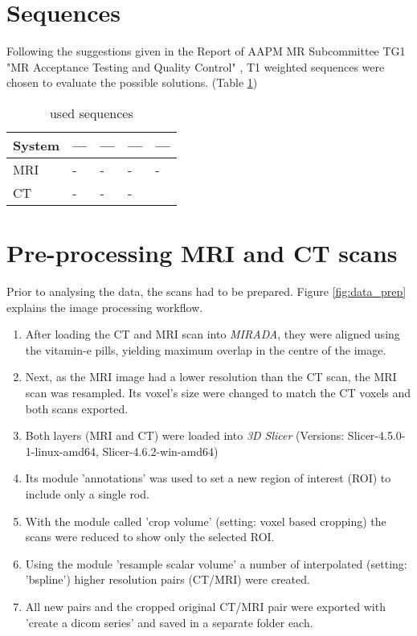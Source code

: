 \section{Sequences}

Following the suggestions given in the Report of AAPM MR Subcommittee TG1 "MR Acceptance Testing and
Quality Control" \cite{Jackson2009}, T1 weighted sequences were chosen to evaluate the possible solutions. (Table \ref{tab:settings})

\begin{table}[h]
\centering
\begin{tabular}{@{}lllll@{}}
System & ---  & --- &  --- & --- \\
\toprule
MRI    & -   & -   & -   & -    \\
CT     & -   & -   & -   &
\end{tabular}
\caption{used sequences}
\label{tab:settings}
\end{table}



\section{Pre-processing MRI and CT scans}
\label{sec:prep}

Prior to analysing the data, the scans had to be prepared.
Figure \ref{fig:data_prep} explains the image processing workflow.

\begin{enumerate}[label=\textbf{Step \arabic*}]
\item After loading the CT and MRI scan into \textit{MIRADA}, they were aligned using the vitamin-e pills, yielding maximum overlap in the centre of the image.
\item Next, as the MRI image had a lower resolution than the CT scan, the MRI scan was resampled.
Its voxel's size were changed to match the CT voxels and both scans exported.
\item Both layers (MRI and CT) were loaded into \textit{3D Slicer} (Versions: Slicer-4.5.0-1-linux-amd64, Slicer-4.6.2-win-amd64)
\item Its module 'annotations' was used to set a new region of interest (ROI) to include only a single rod.
\item With the module called 'crop volume' (setting: voxel based cropping) the scans were reduced to show only the selected ROI.
\item Using the module 'resample scalar volume' a number of interpolated (setting: 'bspline') higher resolution pairs (CT/MRI) were created.
\item All new pairs and the cropped original CT/MRI pair were exported with 'create a dicom series' and saved in a separate folder each.
\end{enumerate}

